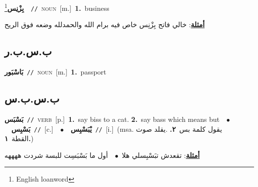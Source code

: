 \documentclass[10pt,a4paper,twoside]{article} %
\begin{document}
\begin{multicols}{2}
{\setlength\topsep{0pt}\textbf{\foreignlanguage{arabic}{بِزْنِس}}\footnote{English loanword}\ \ {\color{gray}\texttt{//}\color{black}}\ \textsc{noun}\ [m.]\ \textbf{1.}~business\  \begin{flushright}\color{gray}\foreignlanguage{arabic}{\textbf{\underline{\foreignlanguage{arabic}{أمثلة}}}: خالي فاتح بِزْنِس خاص فيه برام الله والحمدلله وضعه فوق الريح}\end{flushright}\color{black}} \vspace{2mm}

\vspace{-3mm}
\subsection*{\color{blue}\foreignlanguage{arabic}{ب.س.ب.ر}\color{blue}{ (ntws)}} 

{\setlength\topsep{0pt}\textbf{\foreignlanguage{arabic}{بَاسْبَور}}\ {\color{gray}\texttt{//}\color{black}}\ \textsc{noun}\ [m.]\ \textbf{1.}~passport\ } \vspace{2mm}

\vspace{-3mm}
\subsection*{\color{blue}\foreignlanguage{arabic}{ب.س.ب.س}\color{blue}{}} 

{\setlength\topsep{0pt}\textbf{\foreignlanguage{arabic}{بَسْبَس}}\ {\color{gray}\texttt{//}\color{black}}\ \textsc{verb}\ [p.]\ \textbf{1.}~say biss to a cat.  \textbf{2.}~say bass which means but\ \ $\bullet$\ \ \setlength\topsep{0pt}\textbf{\foreignlanguage{arabic}{بَسْبِس}}\ {\color{gray}\texttt{//}\color{black}}\ [c.]\ \ $\bullet$\ \ \setlength\topsep{0pt}\textbf{\foreignlanguage{arabic}{يْبَسْبِس}}\ {\color{gray}\texttt{//}\color{black}}\ [i.]\ \color{gray}(msa. \foreignlanguage{arabic}{يقول كلمة بس}~\foreignlanguage{arabic}{\textbf{٢.}}  .\foreignlanguage{arabic}{يقلد صوت القطة}~\foreignlanguage{arabic}{\textbf{١.}})\color{black}\  \begin{flushright}\color{gray}\foreignlanguage{arabic}{\textbf{\underline{\foreignlanguage{arabic}{أمثلة}}}: تقعدش تبَسْبِسلي هلا\ $\bullet$\ \  أول ما بَسْبَسِت للبسة شردت ههههه}\end{flushright}\color{black}} \vspace{2mm}


\end{multicols}
\end{document}
